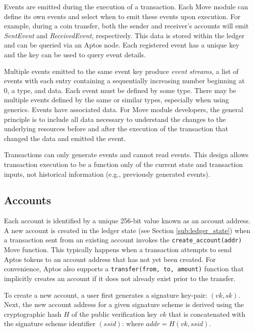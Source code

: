 \documentclass{article}
\begin{document}
Events are emitted during the execution of a transaction. Each Move module can define its own events and select when to emit these events upon execution. For example, during a coin transfer, both the sender and receiver's accounts will emit \emph{SentEvent} and \emph{ReceivedEvent}, respectively. This data is stored within the ledger and can be queried via an Aptos node. Each registered event has a unique key and the key can be used to query event details.

Multiple events emitted to the same event key produce \emph{event streams}, a list of events with each entry containing a sequentially increasing number beginning at 0, a type, and data. Each event must be defined by some type. There may be multiple events defined by the same or similar types, especially when using generics. Events have associated data. For Move module developers, the general principle is to include all data necessary to understand the changes to the underlying resources before and after the execution of the transaction that changed the data and emitted the event.

Transactions can only generate events and cannot read events. This design allows transaction execution to be a function only of the current state and transaction inputs, not historical information (e.g., previously generated events).

\subsection{Accounts}
\label{sec:accounts}

Each account is identified by a unique 256-bit value known as an account address. A new account is created in the ledger state (see Section \ref{sub:ledger_state}) when a transaction sent from an existing account invokes the \texttt{create_account(addr)} Move function. This typically happens when a transaction attempts to send Aptos tokens to an account address that has not yet been created. For convenience, Aptos also supports a \texttt{transfer(from, to, amount)} function that implicitly creates an account if it does not already exist prior to the transfer.

To create a new account, a user first generates a signature key-pair:  $(vk, sk)$. Next, the new account address for a given signature scheme is derived using the cryptographic hash $H$ of the public verification key $vk$ that is concatenated with the signature scheme identifier $(ssid)$: where $addr = H(vk, ssid)$. 
\end{document}
